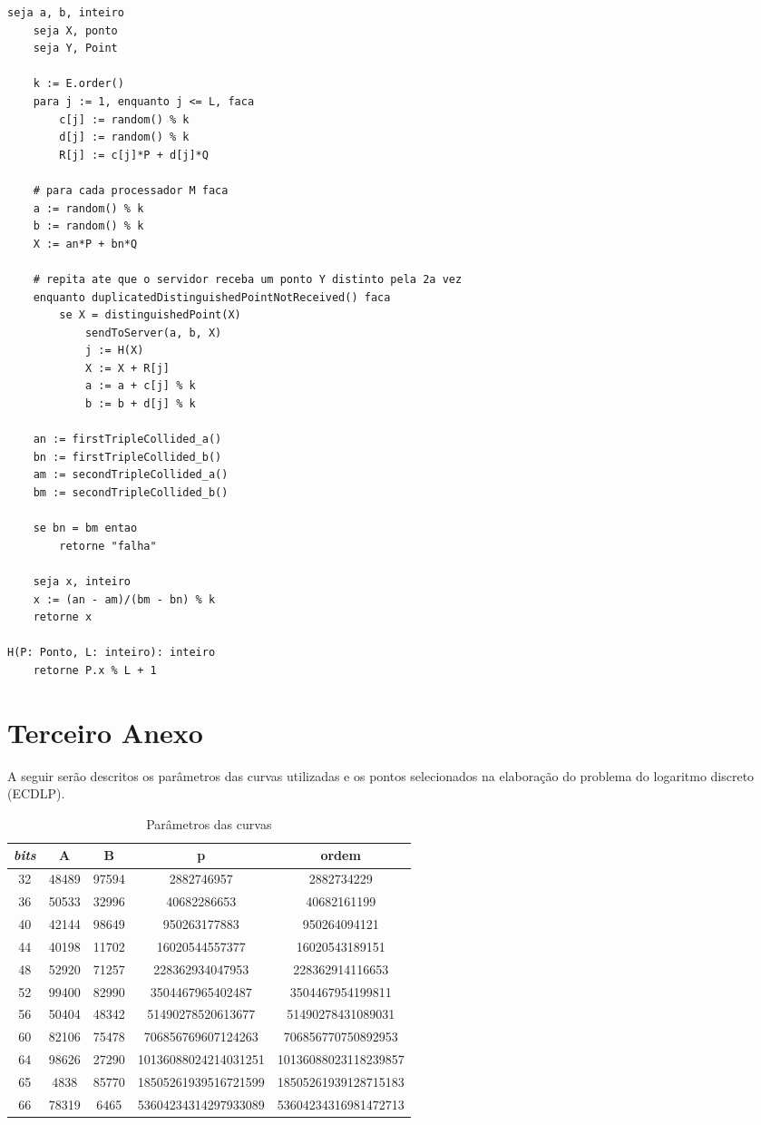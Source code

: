 \begin{anexosenv}
\begin{lstlisting}[caption={Algoritmo Pollard-rho paralelizado.},label=parallelized]
	seja a, b, inteiro
	seja X, ponto
	seja Y, Point

	k := E.order()
	para j := 1, enquanto j <= L, faca
		c[j] := random() % k
		d[j] := random() % k
		R[j] := c[j]*P + d[j]*Q

	# para cada processador M faca
	a := random() % k
	b := random() % k
	X := an*P + bn*Q

	# repita ate que o servidor receba um ponto Y distinto pela 2a vez
	enquanto duplicatedDistinguishedPointNotReceived() faca
		se X = distinguishedPoint(X)
			sendToServer(a, b, X)
			j := H(X)
			X := X + R[j]
			a := a + c[j] % k
			b := b + d[j] % k

	an := firstTripleCollided_a()
	bn := firstTripleCollided_b()
	am := secondTripleCollided_a()
	bm := secondTripleCollided_b()

	se bn = bm entao
		retorne "falha"

	seja x, inteiro
	x := (an - am)/(bm - bn) % k
	retorne x

H(P: Ponto, L: inteiro): inteiro
	retorne P.x % L + 1

\end{lstlisting}

\chapter{Terceiro Anexo} \label{curve_parameters}
A seguir serão descritos os parâmetros das curvas utilizadas e os pontos selecionados na elaboração do problema do logaritmo discreto (ECDLP).

\begin{table}[h]
\centering
\caption{Parâmetros das curvas}
\label{table:required_chips}
\begin{tabular}{|c|c|c|c|c|}
\hline
\multicolumn{1}{|c|}{\textit{bits}} & \textbf{A} & \textbf{B} & \textbf{p} & \textbf{ordem} \\ \hline
32 & 48489 & 97594 & 2882746957 & 2882734229 \\ \hline
36 & 50533 & 32996 & 40682286653 & 40682161199 \\ \hline
40 & 42144 & 98649 & 950263177883 & 950264094121 \\ \hline
44 & 40198 & 11702 & 16020544557377 & 16020543189151 \\ \hline
48 & 52920 & 71257 & 228362934047953 & 228362914116653 \\ \hline
52 & 99400 & 82990 & 3504467965402487 & 3504467954199811 \\ \hline
56 & 50404 & 48342 & 51490278520613677 & 51490278431089031 \\ \hline
60 & 82106 & 75478 & 706856769607124263 & 706856770750892953 \\ \hline
64 & 98626 & 27290 & 10136088024214031251 & 10136088023118239857 \\ \hline
65 & 4838 & 85770 & 18505261939516721599 & 18505261939128715183 \\ \hline
66 & 78319 & 6465 & 53604234314297933089 & 53604234316981472713  \\ \hline
\end{tabular}
\end{table}



\end{anexosenv}
